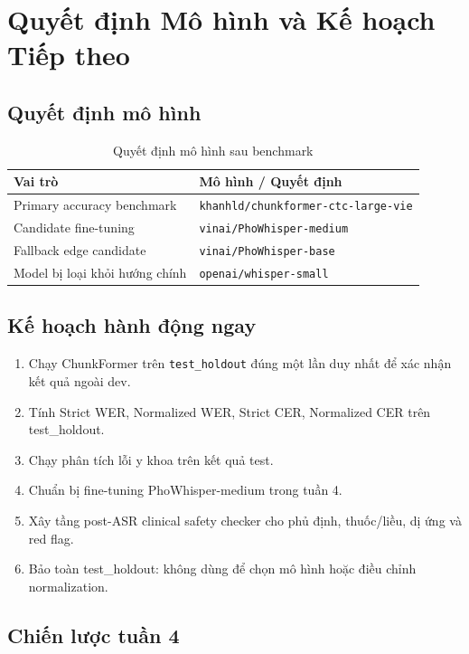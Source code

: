 \documentclass[12pt,a4paper]{article}
\begin{document}
\section{Quyết định Mô hình và Kế hoạch Tiếp theo}

\subsection{Quyết định mô hình}

\begin{table}[h]
\centering
\caption{Quyết định mô hình sau benchmark}
\begin{tabularx}{\textwidth}{|l|X|}
\hline
\textbf{Vai trò} & \textbf{Mô hình / Quyết định} \\
\hline
Primary accuracy benchmark & \texttt{khanhld/chunkformer-ctc-large-vie} \\
\hline
Candidate fine-tuning & \texttt{vinai/PhoWhisper-medium} \\
\hline
Fallback edge candidate & \texttt{vinai/PhoWhisper-base} \\
\hline
Model bị loại khỏi hướng chính & \texttt{openai/whisper-small} \\
\hline
\end{tabularx}
\end{table}

\newpage
\subsection{Kế hoạch hành động ngay}

\begin{enumerate}[leftmargin=1.2cm]
    \item Chạy ChunkFormer trên \texttt{test\_holdout} đúng một lần duy nhất để xác nhận kết quả ngoài dev.
    \item Tính Strict WER, Normalized WER, Strict CER, Normalized CER trên test\_holdout.
    \item Chạy phân tích lỗi y khoa trên kết quả test.
    \item Chuẩn bị fine-tuning PhoWhisper-medium trong tuần 4.
    \item Xây tầng post-ASR clinical safety checker cho phủ định, thuốc/liều, dị ứng và red flag.
    \item Bảo toàn test\_holdout: không dùng để chọn mô hình hoặc điều chỉnh normalization.
\end{enumerate}

\subsection{Chiến lược tuần 4}
\end{document}
